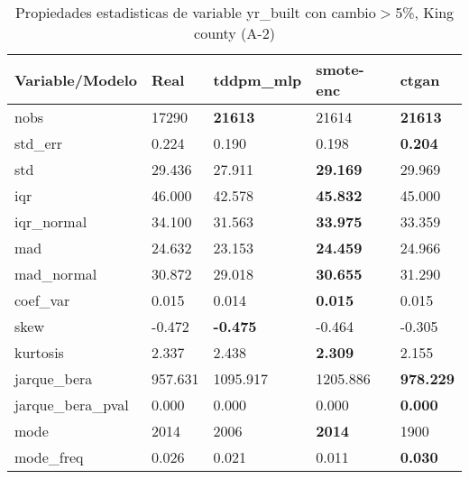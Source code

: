 \begin{table}[H]
\centering
\fontsize{8}{14}\selectfont
\caption{Propiedades estadisticas de variable yr\_built con cambio\ensuremath{>}5\%, King county (A-2)}
\label{table-stats-king county-a-2-yr_built-short}
\begin{tabular}{|l|m{10em}|m{10em}|m{10em}|m{10em}|}
\hline
 \rowcolor[gray]{0.8}
Variable/Modelo & Real & tddpm\_mlp & smote-enc & ctgan \\
\hline nobs & 17290 & \bfseries 21613 & \cellcolor[rgb]{0.9, 0.54, 0.52} 21614 & \bfseries 21613 \\
\hline std\_err & 0.224 & \cellcolor[rgb]{0.9, 0.54, 0.52} 0.190 & 0.198 & \bfseries 0.204 \\
\hline std & 29.436 & \cellcolor[rgb]{0.9, 0.54, 0.52} 27.911 & \bfseries 29.169 & 29.969 \\
\hline iqr & 46.000 & \cellcolor[rgb]{0.9, 0.54, 0.52} 42.578 & \bfseries 45.832 & 45.000 \\
\hline iqr\_normal & 34.100 & \cellcolor[rgb]{0.9, 0.54, 0.52} 31.563 & \bfseries 33.975 & 33.359 \\
\hline mad & 24.632 & \cellcolor[rgb]{0.9, 0.54, 0.52} 23.153 & \bfseries 24.459 & 24.966 \\
\hline mad\_normal & 30.872 & \cellcolor[rgb]{0.9, 0.54, 0.52} 29.018 & \bfseries 30.655 & 31.290 \\
\hline coef\_var & 0.015 & \cellcolor[rgb]{0.9, 0.54, 0.52} 0.014 & \bfseries 0.015 & 0.015 \\
\hline skew & -0.472 & \bfseries -0.475 & -0.464 & \cellcolor[rgb]{0.9, 0.54, 0.52} -0.305 \\
\hline kurtosis & 2.337 & 2.438 & \bfseries 2.309 & \cellcolor[rgb]{0.9, 0.54, 0.52} 2.155 \\
\hline jarque\_bera & 957.631 & 1095.917 & \cellcolor[rgb]{0.9, 0.54, 0.52} 1205.886 & \bfseries 978.229 \\
\hline jarque\_bera\_pval & 0.000 & \cellcolor[rgb]{0.9, 0.54, 0.52} 0.000 & \cellcolor[rgb]{0.9, 0.54, 0.52} 0.000 & \bfseries 0.000 \\
\hline mode & 2014 & 2006 & \bfseries 2014 & \cellcolor[rgb]{0.9, 0.54, 0.52} 1900 \\
\hline mode\_freq & 0.026 & 0.021 & \cellcolor[rgb]{0.9, 0.54, 0.52} 0.011 & \bfseries 0.030 \\
\hline
\end{tabular}
\end{table}
